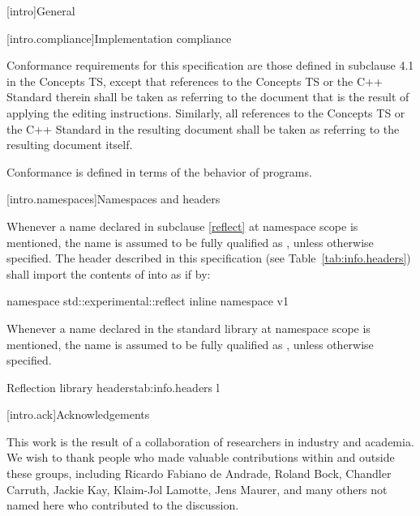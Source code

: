
[intro]{General}

[intro.compliance]{Implementation compliance}

\pnum
Conformance requirements for this specification are those defined in subclause
4.1 in the Concepts TS, except that references to the Concepts TS or the C++
Standard therein shall be taken as referring to the document that is the result
of applying the editing instructions. Similarly, all references to the Concepts
TS or the C++ Standard in the resulting document shall be taken as referring to
the resulting document itself.
\begin{note}
Conformance is defined in terms of the behavior of programs.
\end{note}

[intro.namespaces]{Namespaces and headers}

\pnum
Whenever a name  declared in subclause \ref{reflect} at namespace scope
is mentioned, the name  is assumed to be fully qualified as
, unless otherwise specified.
The header described in this specification (see Table~\ref{tab:info.headers})
shall import the contents of  into
 as if by:

\begin{codeblock}
namespace std::experimental::reflect {
  inline namespace v1 {}
}
\end{codeblock}

\pnum
Whenever a name  declared in the standard library at namespace scope is
mentioned, the name  is assumed to be fully qualified as
, unless otherwise specified.

\begin{floattable}{Reflection library headers}{tab:info.headers}
{l}
\topline
{} \\
\end{floattable}

[intro.ack]{Acknowledgements}

\pnum
This work is the result of a collaboration of researchers in industry and
academia.  We wish to thank people who made valuable contributions within and
outside these groups, including Ricardo Fabiano de Andrade, Roland Bock,
Chandler Carruth, Jackie Kay, Klaim-Jol Lamotte, Jens Maurer, and many others
not named here who contributed to the discussion.
